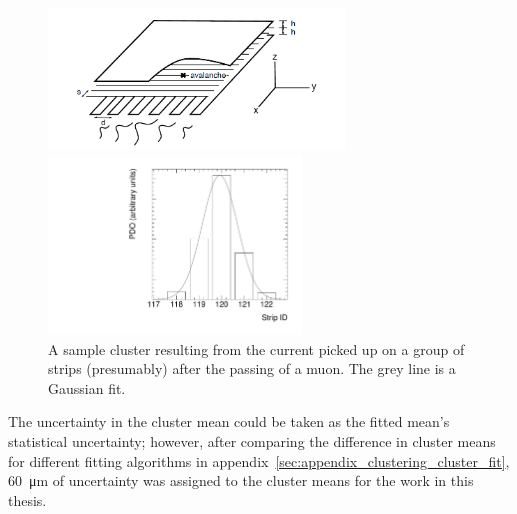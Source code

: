 \begin{figure}
    \centering
    \includegraphics[width = 0.7\textwidth]{figures/mwpc_lefebvre_thesis_gatti.png}
    \caption{A sketch of an sTGC-like detector. The position of the avalanche could be extracted from the wires and strips that picked up the avalanche signal. The signals on individual strips are sketched. Clustering was the processs of fitting a Gaussian to the peak value of the individual contiguous strips, as is done in figure~\ref{fig:sample_cluster}. In this work, the x(y)-coordinate will always refer to the coordinate perpendicular to the wires (strips)~\cite{lefebvre_thesis, gatti_optimum_1979}.}
    \label{fig:mwpc_coords}
    \vspace*{\floatsep}
    \centering
    \includegraphics[width = 0.6\textwidth]{figures/sample_cluster_QL2C04_event5_layer2.pdf}
    \caption{A sample cluster resulting from the current picked up on a group of strips (presumably) after the passing of a muon. The grey line is a Gaussian fit.}
    \label{fig:sample_cluster}
\end{figure}

The uncertainty in the cluster mean could be taken as the fitted mean's statistical uncertainty; however, after comparing the difference in cluster means for different fitting algorithms in appendix~\ref{sec:appendix_clustering_cluster_fit}, \SI{60}{\micro\meter} of uncertainty was assigned to the cluster means for the work in this thesis.

